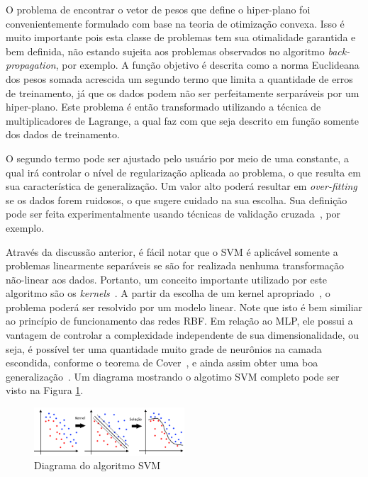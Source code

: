 \documentclass[conference]{IEEEtran}
\begin{document}
	O problema de encontrar o vetor de pesos que define o hiper-plano foi convenientemente formulado com base na teoria de otimização convexa. Isso é muito importante pois esta classe de problemas tem sua otimalidade garantida e bem definida, não estando sujeita aos problemas observados no algoritmo \textit{back-propagation}, por exemplo. A função objetivo é descrita como a norma Euclideana dos pesos somada acrescida um segundo termo que limita a quantidade de erros de treinamento, já que os dados podem não ser perfeitamente serparáveis por um hiper-plano. Este problema é então transformado utilizando a técnica de multiplicadores de Lagrange, a qual faz com que seja descrito em função somente dos dados de treinamento.
	
	O segundo termo pode ser ajustado pelo usuário por meio de uma constante, a qual irá controlar o nível de regularização aplicada ao problema, o que resulta em sua característica de generalização. Um valor alto poderá resultar em \textit{over-fitting} se os dados forem ruidosos, o que sugere cuidado na sua escolha.	Sua definição pode ser feita experimentalmente usando técnicas de validação cruzada~\cite{arlot2010survey}, por exemplo.
	
	Através da discussão anterior, é fácil notar que o SVM é aplicável somente a problemas linearmente separáveis se são for realizada nenhuma transformação não-linear aos dados. Portanto, um conceito importante utilizado por este algoritmo são os \textit{kernels}~\cite{shawetaylor2004kernel}. A partir da escolha de um kernel apropriado~\cite{mercer1909xvi,courant89}, o problema poderá ser resolvido por um modelo linear. Note que isto é bem similiar ao princípio de funcionamento das redes RBF. Em relação ao MLP, ele possui a vantagem de controlar a complexidade independente de sua dimensionalidade, ou seja, é possível ter uma quantidade muito grade de neurônios na camada escondida, conforme o teorema de Cover~\cite{cover1965geometrical}, e ainda assim obter uma boa generalização~\cite{scholkopf2018learning}. 	Um diagrama mostrando o algotimo SVM completo pode ser visto na Figura \ref{fig:svm-completo}.
	
	\begin{figure}[thpbh]
		\centering
		\includegraphics[width=0.5\textwidth]{svm-completo.png}
		\caption{Diagrama do algoritmo SVM}
		\label{fig:svm-completo}
	\end{figure}
	
\end{document}
